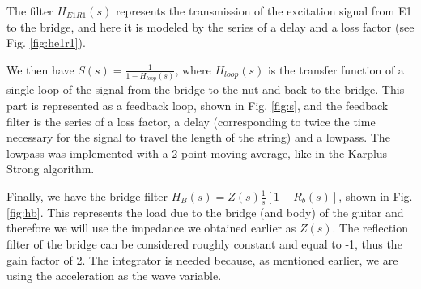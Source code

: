 \documentclass[a4paper]{article}
\begin{document}
The filter $H_{E1R1}(s)$ represents the transmission of the excitation signal from E1 to the bridge, and here it is modeled by the series of a delay and a loss factor (see Fig. \ref{fig:he1r1}).

We then have $S(s) = \frac{1}{1 - H_{loop}(s)}$, where $H_{loop}(s)$ is the transfer function of a single loop of the signal from the bridge to the nut and back to the bridge. This part is represented as a feedback loop, shown in Fig. \ref{fig:s}, and the feedback filter is the series of a loss factor, a delay (corresponding to twice the time necessary for the signal to travel the length of the string) and a lowpass. The lowpass was implemented with a 2-point moving average, like in the Karplus-Strong algorithm.

Finally, we have the bridge filter $H_B(s) = Z(s)\frac{1}{s} \left[ 1 - R_b(s) \right]$, shown in Fig. \ref{fig:hb}. This represents the load due to the bridge (and body) of the guitar and therefore we will use the impedance we obtained earlier as $Z(s)$. The reflection filter of the bridge can be considered roughly constant and equal to -1, thus the gain factor of 2. The integrator is needed because, as mentioned earlier, we are using the acceleration as the wave variable.
\end{document}
